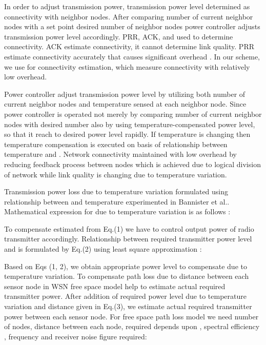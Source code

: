 \documentclass{article}
\begin{document}
In order to adjust transmission power, transmission power level determined as connectivity with neighbor nodes. After comparing number of current neighbor nodes with a set point desired number of neighbor nodes power controller adjusts transmission power level accordingly. PRR, ACK, and  used to determine connectivity. ACK estimate connectivity, it cannot determine link quality. PRR estimate connectivity accurately that causes significant overhead \cite{6}. In our scheme, we use  for connectivity estimation, which measure connectivity with relatively low overhead.


Power controller adjust transmission power level by utilizing both number of current neighbor nodes and temperature sensed at each neighbor node. Since power controller is operated not merely by comparing number of current neighbor nodes with desired number also by using temperature-compensated power level, so that it reach to desired power level rapidly. If temperature is changing then temperature compensation is executed on basis of relationship between temperature and . Network connectivity maintained with low overhead by reducing feedback process between nodes which is achieved due to logical division of network while link quality is changing due to temperature variation.


Transmission power loss due to temperature variation formulated using relationship between  and temperature experimented in Bannister et al.. Mathematical expression for  due to temperature variation is as follows \cite{7}:



To compensate  estimated from Eq.(1) we have to control output power of radio transmitter accordingly. Relationship between required transmitter power level and  is formulated by Eq.(2) using least square approximation \cite{7}:



Based on Eqs (1, 2), we obtain appropriate power level to compensate  due to temperature variation. To compensate path loss due to distance  between each sensor node in WSN free space model help to estimate actual required transmitter power. After addition of required power level due to temperature variation and distance given in Eq.(3), we estimate actual required transmitter power between each sensor node. For free space path loss model  we need number of nodes, distance between each node, required  depends upon , spectral efficiency , frequency  and receiver noise figure  required:

 
\end{document}
